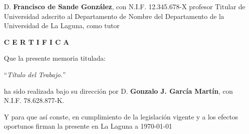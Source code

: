 %
%
%
%

\newpage
\thispagestyle{empty}

D. {\bf Francisco de Sande González}, con N.I.F. 12.345.678-X
profesor
Titular de Universidad
adscrito al Departamento
de Nombre del Departamento
de la Universidad de La Laguna, como tutor

\bigskip
\bigskip
{\bf C E R T I F I C A}

\bigskip
\bigskip
\bigskip
Que la presente memoria titulada:

\bigskip
``{\it Título del Trabajo.}''

\bigskip
\bigskip
\bigskip

\noindent ha sido realizada bajo su dirección por D. {\bf Gonzalo J. García Martín},
con N.I.F. 78.628.877-K.

\bigskip
\bigskip

Y para que así conste, en cumplimiento de la legislación vigente y a los efectos
oportunos firman la presente en La Laguna a \today

